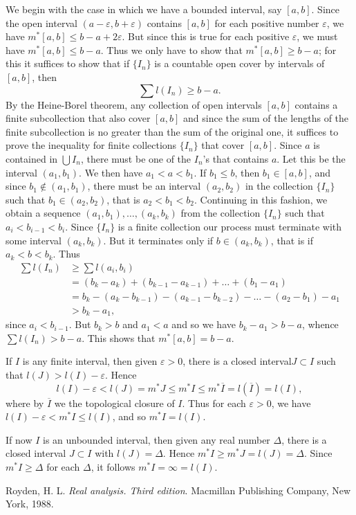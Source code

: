 \documentclass[12pt]{article}
\begin{document}
We begin with the case in which we have a  bounded interval, say $[a,b]$. Since the open interval $(a-\varepsilon,b+\varepsilon)$
contains $[a,b]$ for each positive number $\varepsilon$, we have 
$m^*[a,b]\le b-a+2\varepsilon$. But since this is true for each positive $\varepsilon$, we must have $m^*[a,b]\le b-a$. Thus we only have to show that $m^*[a,b]\ge b-a$; for this it suffices to show that if $\{I_n\}$ is a countable open cover by	intervals of $[a,b]$, then
\begin{equation*}
\sum l(I_n)\ge b-a.
\end{equation*}
By the Heine-Borel theorem, any collection of open intervals  $[a,b]$ contains a finite subcollection that also cover $[a,b]$ and since the  sum of the lengths of the finite subcollection is no greater than the sum of  the original one, it suffices to prove the inequality for finite collections $\{I_n\}$ that cover $[a,b]$. Since $a$ is contained in $\bigcup I_n$, there must be one of the $I_n$'s that contains $a$. Let this be the interval $(a_1,b_1)$. We then have $a_1<a<b_1$. If $b_1\le b$, then $b_1\in [a,b]$, and since $b_1\not\in (a_1,b_1)$, there must be an interval $(a_2,b_2)$ in the collection $\{I_n\}$ such that $b_1\in (a_2,b_2)$, that is $a_2<b_1<b_2$. Continuing in this fashion, we obtain a sequence $(a_1,b_1),\dots,(a_k,b_k)$ from the collection $\{I_n\}$ such that $a_i<b_{i-1}<b_i$. Since $\{I_n\}$ is a finite collection our process must terminate with some interval $(a_k,b_k)$. But it terminates only if $b\in (a_k,b_k)$, that is if $a_k<b<b_k$. Thus
\begin{equation*}
\begin{aligned}
\sum l(I_n) &\ge\sum l(a_i,b_i) \\ 
&= (b_k-a_k)+(b_{k-1}-a_{k-1})+\dots+(b_1-a_1)\\
&=b_k-(a_k-b_{k-1})-(a_{k-1}-b_{k-2})-\dots-(a_2-b_1)-a_1\\
&>b_k-a_1,
\end{aligned}
\end{equation*}
since $a_i<b_{i-1}$. But $b_k>b$ and $a_1<a$ and so we have $b_k-a_1>b-a$, whence $\sum l(I_n)>b-a$. This shows that $m^*[a,b]=b-a$.	

If $I$ is any finite interval, then given $\varepsilon>0$, there is a closed interval$ J\subset I$ such that $l(J)>l(I)-\varepsilon$. Hence
$$
l(I)-\varepsilon<l(J)=m^*J\le m^*I\le m^*\overline I=l(\overline I)=l(I),
$$
where by $\overline I$ we  the topological closure of $I$.
Thus for each $\varepsilon>0$, we have $l(I)-\varepsilon<m^*I\le l(I)$,
and so $m^*I=l(I)$.

If now $I$ is an unbounded interval, then given any real number $\Delta$, there is a closed interval $J\subset I$ with $l(J)=\Delta$. Hence $m^*I\ge m^*J=l(J)=\Delta$. Since $m^*I\ge\Delta$ for each $\Delta$,  it follows $m^*I=\infty=l(I)$.

\begin{thebibliography}
{}Royden, H. L. \emph{Real analysis. Third edition}. Macmillan Publishing Company, New York, 1988.
\end{thebibliography}
\end{document}
